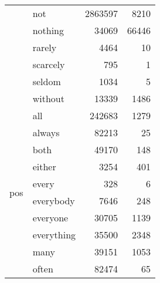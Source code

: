 \begin{longtable}[ht]{llrr}
 & not & {\cellcolor[HTML]{081D58}} \color[HTML]{F1F1F1} 2863597 & {\cellcolor[HTML]{FBFDD0}} \color[HTML]{000000} 8210 \\
 & nothing & {\cellcolor[HTML]{FDFED5}} \color[HTML]{000000} 34069 & {\cellcolor[HTML]{CEECB3}} \color[HTML]{000000} 66446 \\
 & rarely & {\cellcolor[HTML]{FFFFD9}} \color[HTML]{000000} 4464 & {\cellcolor[HTML]{FFFFD9}} \color[HTML]{000000} 10 \\
 & scarcely & {\cellcolor[HTML]{FFFFD9}} \color[HTML]{000000} 795 & {\cellcolor[HTML]{FFFFD9}} \color[HTML]{000000} 1 \\
 & seldom & {\cellcolor[HTML]{FFFFD9}} \color[HTML]{000000} 1034 & {\cellcolor[HTML]{FFFFD9}} \color[HTML]{000000} 5 \\
 & without & {\cellcolor[HTML]{FEFFD8}} \color[HTML]{000000} 13339 & {\cellcolor[HTML]{FEFFD8}} \color[HTML]{000000} 1486 \\
\cline{1-4}
\multirow[c]{16}{*}{pos} & all & {\cellcolor[HTML]{F3FABF}} \color[HTML]{000000} 242683 & {\cellcolor[HTML]{FEFFD8}} \color[HTML]{000000} 1279 \\
 & always & {\cellcolor[HTML]{FBFDD0}} \color[HTML]{000000} 82213 & {\cellcolor[HTML]{FFFFD9}} \color[HTML]{000000} 25 \\
 & both & {\cellcolor[HTML]{FDFED4}} \color[HTML]{000000} 49170 & {\cellcolor[HTML]{FFFFD9}} \color[HTML]{000000} 148 \\
 & either & {\cellcolor[HTML]{FFFFD9}} \color[HTML]{000000} 3254 & {\cellcolor[HTML]{FFFFD9}} \color[HTML]{000000} 401 \\
 & every & {\cellcolor[HTML]{FFFFD9}} \color[HTML]{000000} 328 & {\cellcolor[HTML]{FFFFD9}} \color[HTML]{000000} 6 \\
 & everybody & {\cellcolor[HTML]{FFFFD9}} \color[HTML]{000000} 7646 & {\cellcolor[HTML]{FFFFD9}} \color[HTML]{000000} 248 \\
 & everyone & {\cellcolor[HTML]{FEFFD6}} \color[HTML]{000000} 30705 & {\cellcolor[HTML]{FEFFD8}} \color[HTML]{000000} 1139 \\
 & everything & {\cellcolor[HTML]{FDFED5}} \color[HTML]{000000} 35500 & {\cellcolor[HTML]{FEFFD6}} \color[HTML]{000000} 2348 \\
 & many & {\cellcolor[HTML]{FDFED5}} \color[HTML]{000000} 39151 & {\cellcolor[HTML]{FFFFD9}} \color[HTML]{000000} 1053 \\
 & often & {\cellcolor[HTML]{FBFDD0}} \color[HTML]{000000} 82474 & {\cellcolor[HTML]{FFFFD9}} \color[HTML]{000000} 65 \\

\end{longtable}
